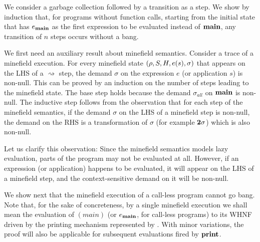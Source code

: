 \documentclass[preprint,9pt]{sigplanconf}
\newcommand{\bang}{\mbox{\sc bang}}
\begin{document}
  We  consider  a  garbage  collection  followed  by  a
  transition as a step.  We show by induction that, for
  programs  without function  calls, starting  from the
  initial  state  that  has $e_{\mathbf{main}}$  as  the  first
  expression to  be evaluated  instead of  $\mathbf{main}$, any
  transition of $n$ steps occurs without a \bang.

We  first  need  an auxiliary  result  about  minefield
semantics. Consider  a trace of a  minefield execution.
For every minefield state  $(\rho, S, H, e(s), \sigma)$
that appears  on the LHS of  a $\rightsquigarrow$ step,
the  demand   $\sigma$  on   the  expression   $e$  (or
application $s$) is non-null.  This can be proved by an
induction  on  the  number  of  steps  leading  to  the
minefield  state.   The  base step  holds  because  the
demand $\sigma_{all}$  on $\mathbf{main}$ is  non-null.  The
inductive step  follows from  the observation  that for
each  step of  the minefield  semantics, if  the demand
$\sigma$ on  the LHS of  a minefield step  is non-null,
the demand on  the RHS is a  transformation of $\sigma$
(for example ${\mathbf{2}}\sigma$) which is also non-null.

Let us clarify this observation:  Since the minefield semantics models
lazy  evaluation,  parts  of  the  program may  not  be  evaluated  at
all.  However,  if  an  expression  (or  application)  happens  to  be
evaluated, it  will appear  on the  LHS of a  minefield step,  and the
context-sensitive demand on it will be non-null.

We  show  next  that   the  minefield  execution  of  a
call-less program  cannot go \bang. Note  that, for the
sake of  concreteness, by a single  minefield execution
we   shall  mean   the  evaluation   of  $(main)$   (or
$e_{\mathbf{main}}$,  for call-less  programs)  to its  WHNF
driven  by   the  printing  mechanism   represented  by
\print. With  minor variations, the proof  will also be
applicable   for   subsequent  evaluations   fired   by
$\mathbf{print}$.
\end{document}
